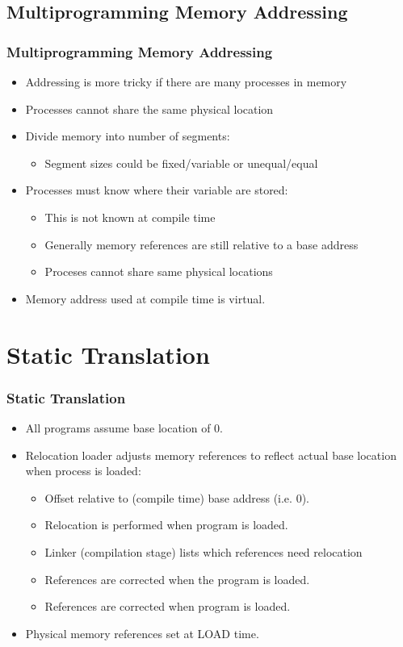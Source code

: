 \documentclass{beamer}
\begin{document}
\subsection{Multiprogramming Memory Addressing}
\begin{frame}
\frametitle{Multiprogramming Memory Addressing}
\begin{itemize}
\item Addressing is more tricky if there are many processes in memory
\item Processes cannot share the same physical location
\item Divide memory into number of segments:
\begin{itemize}
\item Segment sizes could be fixed/variable or unequal/equal
\end{itemize}
\item Processes must know where their variable are stored:
\begin{itemize}
\item This is not known at compile time
\item Generally memory references are still relative to a base address
\item Proceses cannot share same physical locations
\end{itemize}
\item Memory address used at compile time is virtual.
\end{itemize}
\end{frame}
\section{Static Translation}
\begin{frame}
\frametitle{Static Translation}
\begin{itemize}
\item All programs assume base location of 0.
\item {\color{red}Relocation loader} adjusts memory references to reflect actual base location when process is loaded:
\begin{itemize}
\item Offset relative to (compile time) base address (i.e. 0).
\item Relocation is performed when program is loaded.
\item Linker (compilation stage) lists which references need relocation
\item References are corrected when the program is loaded.
\item References are corrected when program is loaded.
\end{itemize}
\item Physical memory references set at LOAD time.
\end{itemize}
\end{frame}
\end{document}
